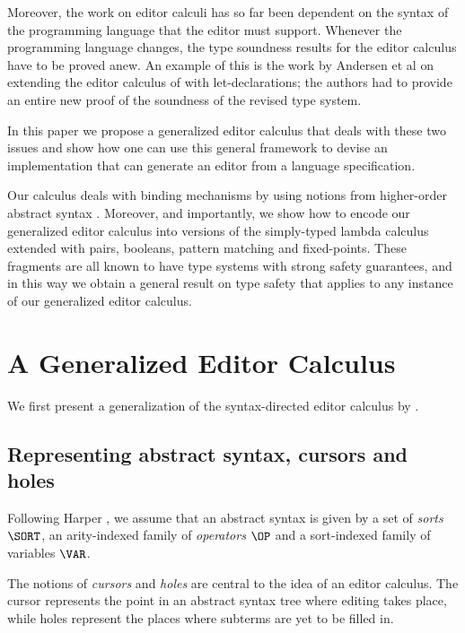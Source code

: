 \documentclass[sigplan,review]{acmart}
\begin{document}
Moreover, the work on editor calculi has so far been dependent on the
syntax of the programming language that the editor must
support. Whenever the programming language changes, the type soundness
results for the editor calculus have to be proved anew. An example of
this is the work by Andersen et al \cite{10.1145/3587216.3587221} on
extending the editor calculus of \cite{type_safe_structure_editor}
with let-declarations; the authors had to provide an entire new proof
of the soundness of the revised type system.

In this paper we propose a generalized editor calculus that deals with
these two issues and show how one can use this general framework to
devise an implementation that can generate an editor from a language
specification.

Our calculus deals with binding mechanisms by using notions from
higher-order abstract syntax \cite{hoas}. Moreover, and importantly,
we show how to encode our generalized editor calculus into versions of
the simply-typed lambda calculus extended with pairs, booleans,
pattern matching and fixed-points. These fragments are all known to
have type systems with strong safety guarantees, and in this way we
obtain a general result on type safety that applies to any instance of
our generalized editor calculus.

\section{A Generalized Editor Calculus}\label{sec:general_editor}

We first present a generalization of the syntax-directed editor
calculus by \cite{type_safe_structure_editor}.

\subsection{Representing abstract syntax, cursors and holes}

Following Harper \cite{harper_foundations}, we assume that an abstract
syntax is given by a set of \emph{sorts} $\SORT$, an arity-indexed
family of \emph{operators} $\OP$ and a sort-indexed family of
variables $\VAR$.

The notions of \emph{cursors} and \emph{holes} are central to the idea
of an editor calculus. The cursor represents the point in an abstract
syntax tree where editing takes place, while holes represent the
places where subterms are yet to be filled in.
\end{document}
